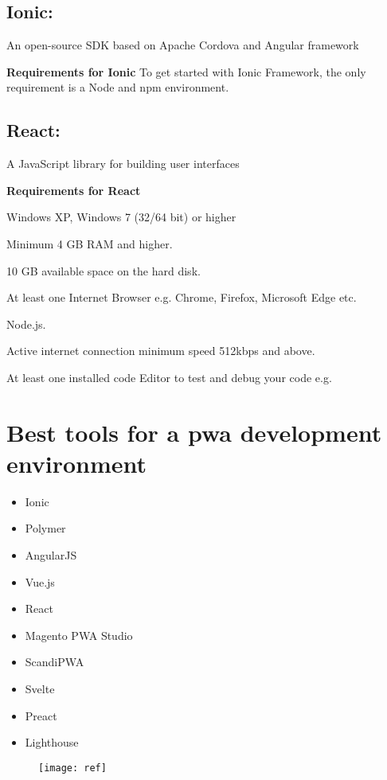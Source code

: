 \documentclass{article}
\begin{document}
\subsection{Ionic:}
An open-source SDK based on Apache Cordova and Angular framework

\textbf{Requirements for Ionic}
To get started with Ionic Framework, the only requirement is a Node and npm environment. 

\subsection{React:}
A JavaScript library for building user interfaces 

\textbf{Requirements for React}

Windows XP, Windows 7 (32/64 bit) or higher

Minimum 4 GB RAM and higher.

10 GB available space on the hard disk.

At least one Internet Browser e.g. Chrome, Firefox, Microsoft Edge etc.

Node.js.

Active internet connection minimum speed 512kbps and above.

At least one installed code Editor to test and debug your code e.g. 

\section{Best tools for a pwa development environment} 
\begin{itemize}
	\item Ionic
	\item Polymer
	\item AngularJS
	\item Vue.js
	\item React
	\item Magento PWA Studio
	\item ScandiPWA
	\item Svelte 
	\item Preact 
	\item Lighthouse 
\end{itemize}
\newpage

\begin{figure}
	\centering
	\texttt{[image: ref]}
\end{figure}
\end{document}
